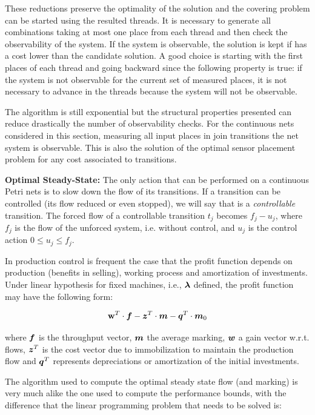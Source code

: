 These reductions preserve the optimality of the solution and the covering problem can be started using the resulted threads. It is necessary to generate all combinations taking at most one place from each thread and then check the observability of the system. If the system is observable, the solution is kept if has a cost lower than the candidate solution. A good choice is starting with the first places of each thread and going backward since the following property is true: if the system is not observable for the current
set of measured places, it is not necessary to advance in the threads because the system will not be observable.

The algorithm is still exponential but the structural properties presented can reduce drastically the number of observability checks. For the continuous nets considered in this section, measuring all input places in join transitions the net system is observable. This is also the solution of the optimal sensor placement problem for any cost associated to transitions.



{\bf Optimal Steady-State:}
The only action that can be performed on a continuous Petri nets is to slow down the flow of its transitions. If a transition can be controlled (its flow reduced or even stopped), we will say that is a \textit{controllable} transition. The forced flow of a controllable transition $t_j$ becomes $f_j - u_j$, where $f_j$ is the flow of the unforced system, i.e. without control, and $u_j$ is the control action $0 \leq u_j \leq f_j$.

In production control is frequent the case that the profit function depends on production (benefits in selling), working process and amortization of investments. Under linear hypothesis for fixed machines, i.e., $\b{\lambda}$ defined, the profit function may have the following form:

\begin{equation}
\mathbf{w}^T \cdot \b{f} - \b{z}^T \cdot \b{m} - \b{q}^T \cdot \mo
\end{equation}

where $\b{f}$ is the throughput vector, $\b{m}$ the average marking, $\b{w}$ a gain vector w.r.t. flows, $\b{z}^T$ is the cost vector due to immobilization to maintain the production flow and $\b{q}^T$ represents depreciations or amortization of the initial investments.

The algorithm used to compute the optimal steady state flow (and marking) is very much alike the one used to compute the performance bounds, with the difference that the linear programming problem that needs to be solved is:

